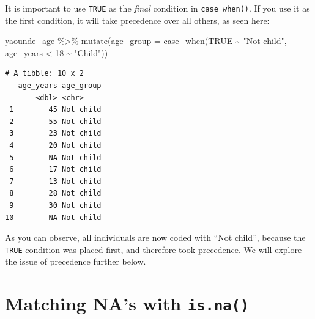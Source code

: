 \documentclass[
  letterpaper,
  DIV=11,
  numbers=noendperiod]{scrreprt}
\newenvironment{Shaded}{\begin{snugshade}}{\end{snugshade}}
\newcommand{\AttributeTok}[1]{\textcolor[rgb]{0.40,0.45,0.13}{#1}}
\newcommand{\ConstantTok}[1]{\textcolor[rgb]{0.56,0.35,0.01}{#1}}
\newcommand{\DecValTok}[1]{\textcolor[rgb]{0.68,0.00,0.00}{#1}}
\newcommand{\FunctionTok}[1]{\textcolor[rgb]{0.28,0.35,0.67}{#1}}
\newcommand{\NormalTok}[1]{\textcolor[rgb]{0.00,0.23,0.31}{#1}}
\newcommand{\SpecialCharTok}[1]{\textcolor[rgb]{0.37,0.37,0.37}{#1}}
\newcommand{\StringTok}[1]{\textcolor[rgb]{0.13,0.47,0.30}{#1}}
\begin{document}
\begin{tcolorbox}[enhanced jigsaw, colframe=quarto-callout-caution-color-frame, rightrule=.15mm, opacityback=0, breakable, coltitle=black, colbacktitle=quarto-callout-caution-color!10!white, bottomrule=.15mm, leftrule=.75mm, toprule=.15mm, arc=.35mm, bottomtitle=1mm, colback=white, left=2mm, opacitybacktitle=0.6, titlerule=0mm, title=\textcolor{quarto-callout-caution-color}{\faFire}\hspace{0.5em}{Watch Out}, toptitle=1mm]

It is important to use \texttt{TRUE} as the \emph{final} condition in
\texttt{case\_when()}. If you use it as the first condition, it will
take precedence over all others, as seen here:

\begin{Shaded}
\begin{Highlighting}[]
\NormalTok{yaounde\_age }\SpecialCharTok{\%\textgreater{}\%}
  \FunctionTok{mutate}\NormalTok{(}\AttributeTok{age\_group =} \FunctionTok{case\_when}\NormalTok{(}\ConstantTok{TRUE} \SpecialCharTok{\textasciitilde{}} \StringTok{"Not child"}\NormalTok{,}
\NormalTok{                               age\_years }\SpecialCharTok{\textless{}} \DecValTok{18} \SpecialCharTok{\textasciitilde{}} \StringTok{"Child"}\NormalTok{))}
\end{Highlighting}
\end{Shaded}

\begin{verbatim}
# A tibble: 10 x 2
   age_years age_group
       <dbl> <chr>    
 1        45 Not child
 2        55 Not child
 3        23 Not child
 4        20 Not child
 5        NA Not child
 6        17 Not child
 7        13 Not child
 8        28 Not child
 9        30 Not child
10        NA Not child
\end{verbatim}

As you can observe, all individuals are now coded with ``Not child'',
because the \texttt{TRUE} condition was placed first, and therefore took
precedence. We will explore the issue of precedence further below.

\end{tcolorbox}

\hypertarget{matching-nas-with-is.na}{%
\section{\texorpdfstring{Matching NA's with
\texttt{is.na()}}{Matching NA's with is.na()}}\label{matching-nas-with-is.na}}
\end{document}
